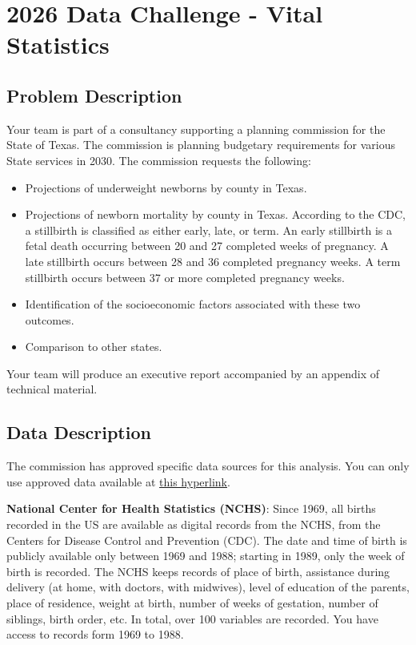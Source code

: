 
\chapter{2026 Data Challenge - Vital Statistics}  

\section{Problem Description}\label{sec:Problem}
Your team is part of a consultancy supporting a planning commission for the State of Texas.  The commission is planning budgetary requirements for various State services in 2030.  The commission requests the following:
\begin{itemize}
	\item Projections of underweight newborns by county in Texas.
	\item Projections of newborn mortality by county in Texas. According to the CDC, a stillbirth is classified as either early, late, or term. An early stillbirth is a fetal death occurring between 20 and 27 completed weeks of pregnancy. A late stillbirth occurs between 28 and 36 completed pregnancy weeks. A term stillbirth occurs between 37 or more completed pregnancy weeks.
	\item Identification of the socioeconomic factors associated with these two outcomes.
	\item Comparison to other states.
\end{itemize}

Your team will produce an executive report accompanied by an appendix of technical material.

\section{Data Description}
The commission has approved specific data sources for this analysis. You can only use approved data available at \href{https://drive.google.com/drive/folders/1oq2yuKgBPOAp4wwRngMAI5b_tvVDlNvm}{this hyperlink}.

\textbf{National Center for Health Statistics (NCHS)}: Since 1969, all births recorded in the US are available as digital records from the NCHS, from the Centers for Disease Control and Prevention (CDC). The date and time of birth is publicly available only between 1969 and 1988; starting in 1989, only the week of birth is recorded. %
The NCHS keeps records of place of birth, assistance during delivery (at home, with doctors, with midwives), level of education of the parents, place of residence, weight at birth, number of weeks of gestation, number of siblings, birth order, etc. In total, over 100 variables are recorded. You have access to records form 1969 to 1988.

